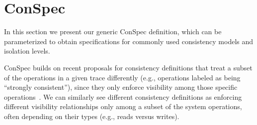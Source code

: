 \documentclass[journal,compsoc]{IEEEtran}
\begin{document}
 \section{ConSpec}\label{sec:syntax}
In this section we present our generic ConSpec definition, which can be parameterized to obtain specifications for commonly used consistency models and 
  isolation levels. %

ConSpec builds on recent proposals for consistency definitions that treat a subset of the operations in a given trace differently (e.g., operations labeled as being ``strongly consistent''), since they only enforce visibility among those specific operations~\cite{Li:2012:MGS:2387880.2387906, Gotsman:2016:CIS:2837614.2837625, cheng-papoc}. We can similarly see different consistency definitions as enforcing different visibility relationships only among a subset of the system operations, often depending on their types (e.g., reads versus writes).
\end{document}
